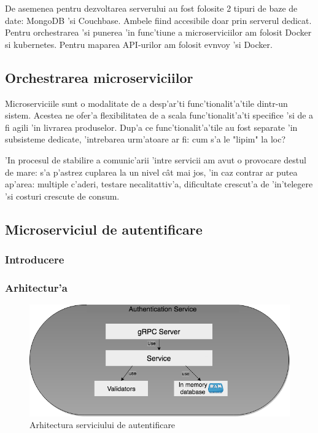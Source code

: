\documentclass[12pt,a4paper,twoside]{report}
\begin{document}
De asemenea pentru dezvoltarea serverului au fost folosite 2 tipuri de baze de date: MongoDB 'si Couchbase. Ambele fiind accesibile doar prin serverul dedicat. Pentru orchestrarea 'si punerea 'in func'tiune a microserviciilor am folosit Docker si kubernetes. Pentru maparea API-urilor am folosit evnvoy 'si Docker.
\subsection{Orchestrarea microserviciilor}
 Microserviciile sunt o modalitate de a desp'ar'ti func'tionalit'a'tile dintr-un sistem. Acestea ne ofer'a flexibilitatea de a scala func'tionalit'a'ti specifice 'si de a fi agili 'in livrarea produselor.
Dup'a ce func'tionalit'a'tile au fost separate 'in subsisteme dedicate, 'intrebarea urm'atoare ar fi: cum s'a le "lipim" la loc?

'In procesul de stabilire a comunic'arii 'intre servicii am avut o provocare destul de mare: s'a p'astrez cuplarea la un nivel cât mai jos, 'in caz contrar ar putea ap'area: multiple c'aderi, testare necalitattiv'a, dificultate crescut'a de 'in'telegere 'si costuri crescute de consum.




\subsection{Microserviciul de autentificare}  \label{s_auth}
\subsubsection{Introducere}
\subsubsection{Arhitectur'a}

\begin{figure}[H]
\begin{center}
\advance\leftskip-3cm
\advance\rightskip-3cm
\includegraphics[keepaspectratio=true,scale=0.4]{img/auth_arch.png}
\caption{Arhitectura serviciului de autentificare}
\label{auth_arch}
\end{center}
\end{figure}
\end{document}
